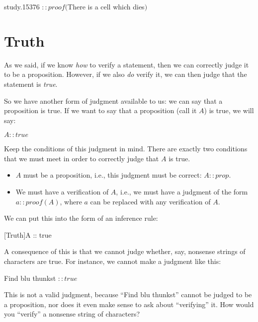 \documentclass[../../../main.tex]{subfiles}
\begin{document}
\begin{center}
  study.15376 $:: proof($There is a cell which dies$)$
\end{center}


\section{Truth}

As we said, if we know \emph{how} to verify a statement, then we can correctly judge it to be a proposition. However, if we also \emph{do} verify it, we can then judge that the statement is \emph{true}. 

So we have another form of judgment available to us: we can say that a proposition is true. If we want to say that a proposition (call it $A$) is true, we will say:

\begin{center}
  $A :: true$
\end{center}

\noindent
Keep the conditions of this judgment in mind. There are exactly two conditions that we must meet in order to correctly judge that $A$ is true.

\begin{itemize}
  \item{$A$ must be a proposition, i.e., this judgment must be correct: $A :: prop$.}
  \item{We must have a verification of $A$, i.e., we must have a judgment of the form $a :: proof(A)$, where $a$ can be replaced with any verification of $A$.}
\end{itemize}

\noindent
We can put this into the form of an inference rule:

\begin{prooftree*}
  [Truth]{A :: true}
\end{prooftree*}

\noindent
A consequence of this is that we cannot judge whether, say, nonsense strings of characters are true. For instance, we cannot make a judgment like this:

\begin{center}
  Find blu thunkst $:: true$
\end{center}

\noindent
This is not a valid judgment, because ``Find blu thunkst'' cannot be judged to be a proposition, nor does it even make sense to ask about ``verifying'' it. How would you ``verify'' a nonsense string of characters?
\end{document}
